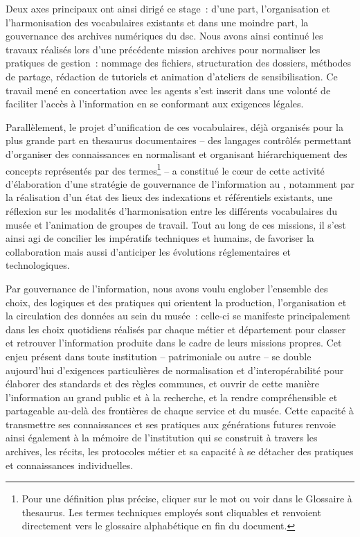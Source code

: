 Deux axes principaux ont ainsi dirigé ce stage~: d'une part, l’organisation et l'harmonisation des vocabulaires existants et dans une moindre part, la gouvernance des archives numériques du \ac{dsc}. Nous avons ainsi continué les travaux réalisés lors d'une précédente mission archives pour normaliser les pratiques de gestion~: nommage des fichiers, structuration des dossiers, méthodes de partage, rédaction de tutoriels et animation d’ateliers de sensibilisation. Ce travail mené en concertation avec les agents s’est inscrit dans une volonté de faciliter l'accès à l'information en se conformant aux exigences légales.

Parallèlement, le projet d'unification de ces vocabulaires, déjà organisés pour la plus grande part en \gls{thesaurus} documentaires -- des langages contrôlés permettant d'organiser des connaissances en normalisant et organisant hiérarchiquement des concepts représentés par des termes\footnote{Pour une définition plus précise, cliquer sur le mot ou voir dans le Glossaire à \gls{thesaurus}. Les termes techniques employés sont cliquables et renvoient directement vers le glossaire alphabétique en fin du document.} -- a constitué le cœur de cette activité d'élaboration d'une stratégie de gouvernance de l'information au \mae, notamment par la réalisation d'un état des lieux des indexations et référentiels existants, une réflexion sur les modalités d’harmonisation entre les différents vocabulaires du musée et l'animation de groupes de travail. Tout au long de ces missions, il s’est ainsi agi de concilier les impératifs techniques et humains, de favoriser la collaboration mais aussi d’anticiper les évolutions réglementaires et technologiques.

\medskip

Par gouvernance de l’information, nous avons voulu englober l’ensemble des choix, des logiques et des pratiques qui orientent la production, l'organisation et la circulation des données au sein du musée~: celle-ci se manifeste principalement dans les choix quotidiens réalisés par chaque métier et département pour classer et retrouver l'information produite dans le cadre de leurs missions propres. Cet enjeu présent dans toute institution -- patrimoniale ou autre -- se double aujourd'hui d'exigences particulières de normalisation et d'interopérabilité pour élaborer des standards et des règles communes, et ouvrir de cette manière l'information au grand public et à la recherche, et la rendre compréhensible et partageable au-delà des frontières de chaque service et du musée. Cette capacité à transmettre ses connaissances et ses pratiques aux générations futures renvoie ainsi également à la mémoire de l'institution qui se construit à travers les archives, les récits, les protocoles métier et sa capacité à se détacher des pratiques et connaissances individuelles.


